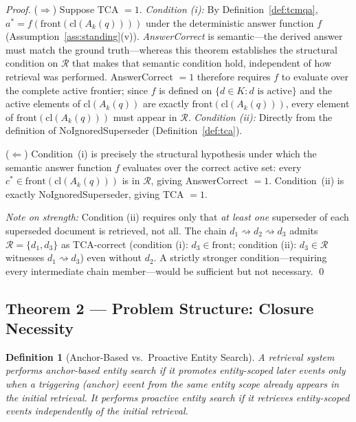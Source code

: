 \documentclass[11pt]{article}
\newtheorem{definition}{Definition}
\begin{document}
\begin{proof}
($\Rightarrow$) Suppose TCA $= 1$.
\emph{Condition (i):} By Definition~\ref{def:tcmqa}, $a^* = f(\mathrm{front}(\mathrm{cl}(A_k(q))))$ under the deterministic answer function $f$ (Assumption~\ref{ass:standing}(v)). \emph{AnswerCorrect} is semantic---the derived answer must match the ground truth---whereas this theorem establishes the structural condition on $\mathcal{R}$ that makes that semantic condition hold, independent of how retrieval was performed. AnswerCorrect $= 1$ therefore requires $f$ to evaluate over the complete active frontier; since $f$ is defined on $\{d \in K : d\text{ is active}\}$ and the active elements of $\mathrm{cl}(A_k(q))$ are exactly $\mathrm{front}(\mathrm{cl}(A_k(q)))$, every element of $\mathrm{front}(\mathrm{cl}(A_k(q)))$ must appear in $\mathcal{R}$.
\emph{Condition (ii):} Directly from the definition of NoIgnoredSuperseder (Definition~\ref{def:tca}).

($\Leftarrow$) Condition~(i) is precisely the structural hypothesis under which the semantic answer function $f$ evaluates over the correct active set: every $c^* \in \mathrm{front}(\mathrm{cl}(A_k(q)))$ is in $\mathcal{R}$, giving AnswerCorrect $= 1$. Condition~(ii) is exactly NoIgnoredSuperseder, giving TCA $= 1$.

\emph{Note on strength:} Condition (ii) requires only that \emph{at least one} superseder of each superseded document is retrieved, not all. The chain $d_1 \rightsquigarrow d_2 \rightsquigarrow d_3$ admits $\mathcal{R} = \{d_1, d_3\}$ as TCA-correct (condition (i): $d_3 \in \mathrm{front}$; condition (ii): $d_3 \in \mathcal{R}$ witnesses $d_1 \rightsquigarrow d_3$) even without $d_2$. A strictly stronger condition---requiring every intermediate chain member---would be sufficient but not necessary. \qed
\end{proof}

\subsection{Theorem 2 — Problem Structure: Closure Necessity}

\setcounter{theorem}{1}
\begin{definition}[Anchor-Based vs.\ Proactive Entity Search]
A retrieval system performs \emph{anchor-based entity search} if it promotes entity-scoped later events only when a triggering (anchor) event from the same entity scope already appears in the initial retrieval. It performs \emph{proactive entity search} if it retrieves entity-scoped events independently of the initial retrieval.
\end{definition}
\end{document}
